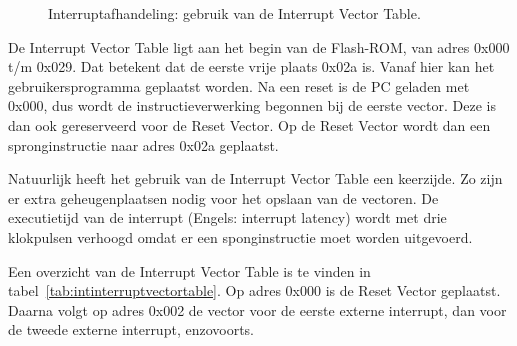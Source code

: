 \begin{figure}[!ht]
\centering
{}
\caption{Interruptafhandeling: gebruik van de Interrupt Vector Table.}
\label{fig:intinterruptdispatchwithvectortable}
\end{figure}

De Interrupt Vector Table ligt aan het begin van de Flash-ROM, van adres
0x000 t/m 0x029. Dat betekent dat de eerste vrije plaats 0x02a is. Vanaf
hier kan het gebruikersprogramma geplaatst worden. Na een reset is de PC
geladen met 0x000, dus wordt de instructieverwerking begonnen bij de eerste
vector. Deze is dan ook gereserveerd voor de Reset Vector. Op de Reset Vector
wordt dan een spronginstructie naar adres 0x02a geplaatst.

Natuurlijk heeft het gebruik van de Interrupt Vector Table een keerzijde.
Zo zijn er extra geheugenplaatsen nodig voor het opslaan van de vectoren.
De executietijd van de interrupt (Engels: interrupt latency) wordt met
drie klokpulsen verhoogd omdat er een sponginstructie moet worden uitgevoerd.

Een overzicht van de Interrupt Vector Table is te vinden in
tabel~\ref{tab:intinterruptvectortable}. Op adres 0x000 is de Reset Vector
geplaatst. Daarna volgt op adres 0x002 de vector voor de eerste externe
interrupt, dan voor de tweede externe interrupt, enzovoorts.

